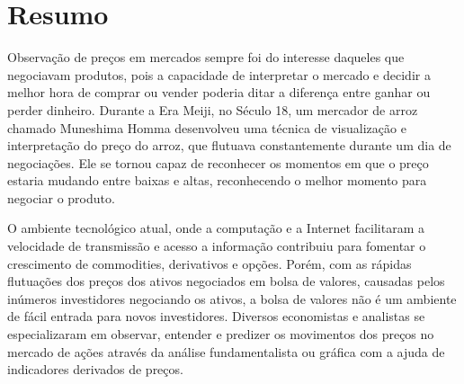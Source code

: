 \documentclass[12pt]{article}
\begin{document}
 




{}
\section*{Resumo}


Observação de preços em mercados sempre foi do interesse daqueles que negociavam produtos,
pois a capacidade de interpretar o mercado e decidir a melhor hora de comprar ou vender
poderia ditar a diferença entre ganhar ou perder dinheiro. Durante a Era Meiji, no Século 18,
um mercador de arroz chamado Muneshima Homma desenvolveu uma técnica de visualização e
interpretação do preço do arroz, que flutuava constantemente durante um dia de negociações.
Ele se tornou capaz de reconhecer os momentos em que o preço estaria mudando entre baixas e
altas, reconhecendo o melhor momento para negociar o produto.


O ambiente tecnológico atual, onde a computação e a Internet facilitaram a velocidade de
transmissão e acesso a informação contribuiu para fomentar o crescimento de commodities,
derivativos e opções.
Porém, com as rápidas flutuações dos preços dos ativos negociados em bolsa de valores,
causadas pelos inúmeros investidores negociando os ativos, a bolsa de valores não é um
ambiente de fácil entrada para novos investidores.
Diversos economistas e analistas se especializaram em observar, entender e predizer os
movimentos dos preços no mercado de ações através da análise fundamentalista ou gráfica
com a ajuda de indicadores derivados de preços.
\end{document}
